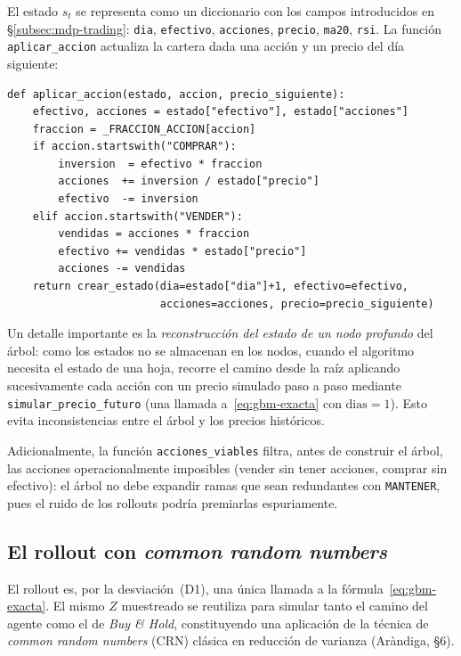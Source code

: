 El estado $s_t$ se representa como un diccionario con los campos introducidos en §\ref{subsec:mdp-trading}: \texttt{dia}, \texttt{efectivo}, \texttt{acciones}, \texttt{precio}, \texttt{ma20}, \texttt{rsi}. La función \texttt{aplicar\_accion} actualiza la cartera dada una acción y un precio del día siguiente:

\begin{lstlisting}[caption={Aplicación de una acción sobre el estado (extracto simplificado).}, label={lst:aplicar}]
def aplicar_accion(estado, accion, precio_siguiente):
    efectivo, acciones = estado["efectivo"], estado["acciones"]
    fraccion = _FRACCION_ACCION[accion]
    if accion.startswith("COMPRAR"):
        inversion  = efectivo * fraccion
        acciones  += inversion / estado["precio"]
        efectivo  -= inversion
    elif accion.startswith("VENDER"):
        vendidas = acciones * fraccion
        efectivo += vendidas * estado["precio"]
        acciones -= vendidas
    return crear_estado(dia=estado["dia"]+1, efectivo=efectivo,
                        acciones=acciones, precio=precio_siguiente)
\end{lstlisting}

Un detalle importante es la \emph{reconstrucción del estado de un nodo profundo} del árbol: como los estados no se almacenan en los nodos, cuando el algoritmo necesita el estado de una hoja, recorre el camino desde la raíz aplicando sucesivamente cada acción con un precio simulado paso a paso mediante \texttt{simular\_precio\_futuro} (una llamada a~\eqref{eq:gbm-exacta} con $\text{dias}=1$). Esto evita inconsistencias entre el árbol y los precios históricos.

Adicionalmente, la función \texttt{acciones\_viables} filtra, antes de construir el árbol, las acciones operacionalmente imposibles (vender sin tener acciones, comprar sin efectivo): el árbol no debe expandir ramas que sean redundantes con \texttt{MANTENER}, pues el ruido de los rollouts podría premiarlas espuriamente.

\subsection{El rollout con \emph{common random numbers}}
\label{subsec:rollout-cod}

El rollout es, por la desviación~(D1), una única llamada a la fórmula~\eqref{eq:gbm-exacta}. El mismo $Z$ muestreado se reutiliza para simular tanto el camino del agente como el de \emph{Buy \& Hold}, constituyendo una aplicación de la técnica de \emph{common random numbers} (CRN) clásica en reducción de varianza (Aràndiga, §6).


